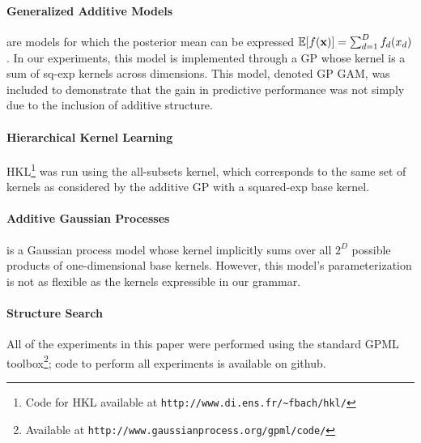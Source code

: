 \documentclass[twoside]{article}
\begin{document}
\paragraph{Generalized Additive Models} are models for which the posterior mean can be expressed $\mathbb{E}[f({\bf{x}})] = \sum_{d=1}^D f_d(x_d)$.  
In our experiments, this model is implemented through a GP whose kernel is a sum of sq-exp kernels across dimensions.  
This model, denoted GP GAM, was included to demonstrate that the gain in predictive performance was not simply due to the inclusion of additive structure.  \cite{hastie1990generalized}

\paragraph{Hierarchical Kernel Learning}	
HKL\footnote{Code for HKL available at \texttt{http://www.di.ens.fr/\textasciitilde fbach/hkl/}} was run using the all-subsets kernel, which corresponds to the same set of kernels as considered by the additive GP with a squared-exp base kernel.

\paragraph{Additive Gaussian Processes} \cite{duvenaud2011additive11} is a Gaussian process model whose kernel implicitly sums over all $2^D$ possible products of one-dimensional base kernels.  
However, this model's parameterization is not as flexible as the kernels expressible in our grammar.

\paragraph{Structure Search}
All of the experiments in this paper were performed using the standard GPML toolbox\footnote{Available at \texttt{http://www.gaussianprocess.org/gpml/code/}}; code to perform all experiments is available on github.


\end{document}
